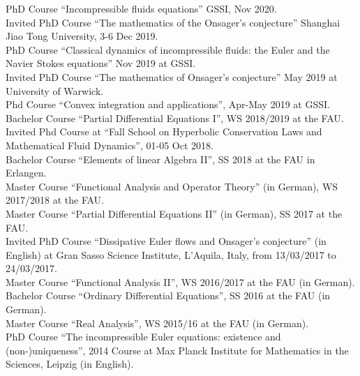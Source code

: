 \documentclass[10pt]{article}
\begin{document}
PhD Course  ``Incompressible fluids equations'' GSSI, Nov 2020.\\

Invited PhD Course ``The mathematics of the Onsager's conjecture''
 Shanghai Jiao Tong University, 3-6 Dec 2019.\\

PhD Course ``Classical dynamics of incompressible fluids: the Euler and the Navier Stokes
equations'' Nov 2019 at GSSI.\\

Invited PhD Course ``The mathematics of Onsager's conjecture'' May 2019 at University of Warwick.\\

Phd Course ``Convex integration and applications'', Apr-May 2019 at GSSI.\\ 

Bachelor Course ``Partial Differential Equations I'', WS 2018/2019 at the FAU.\\ 

Invited Phd Course at ``Fall School on Hyperbolic Conservation Laws and Mathematical Fluid Dynamics'', 01-05 Oct 2018.\\

Bachelor Course ``Elements of linear Algebra II'', SS 2018  at the FAU in Erlangen.\\

Master Course ``Functional Analysis and Operator Theory'' (in German), WS 2017/2018 at the FAU.\\

Master Course ``Partial Differential Equations II'' (in German), SS 2017 at the FAU.\\

Invited PhD Course ``Dissipative Euler flows and Onsager's conjecture'' (in English) at Gran Sasso Science Institute, L'Aquila, Italy, from 13/03/2017 to 24/03/2017.\\

Master Course ``Functional Analysis II'', WS 2016/2017 at the FAU (in German).\\

Bachelor Course ``Ordinary Differential Equations'', SS 2016 at the FAU (in German).\\

Master Course ``Real Analysis'', WS 2015/16 at the FAU (in German).\\

PhD Course ``The incompressible Euler equations: existence and (non-)uniqueness'', 2014 Course at Max Planck Institute for Mathematics in the Sciences, Leipzig (in English).\\
\end{document}
